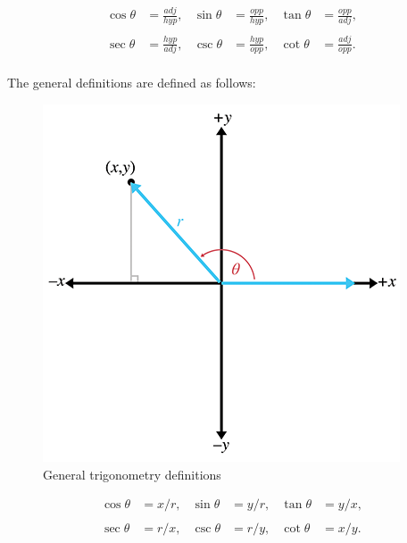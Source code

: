 \documentclass[11pt]{article}
\begin{document}
\[\begin{matrix}
{\cos\theta} & {= \frac{\mathit{a}\mathit{d}\mathit{j}}{\mathit{h}\mathit{y}\mathit{p}},} & {\sin\theta} & {= \frac{\mathit{o}\mathit{p}\mathit{p}}{\mathit{h}\mathit{y}\mathit{p}},} & {\tan\theta} & {= \frac{\mathit{o}\mathit{p}\mathit{p}}{\mathit{a}\mathit{d}\mathit{j}},} \\
 & & & & & \\
{\sec\theta} & {= \frac{\mathit{h}\mathit{y}\mathit{p}}{\mathit{a}\mathit{d}\mathit{j}},} & {\csc\theta} & {= \frac{\mathit{h}\mathit{y}\mathit{p}}{\mathit{o}\mathit{p}\mathit{p}},} & {\cot\theta} & {= \frac{\mathit{a}\mathit{d}\mathit{j}}{\mathit{o}\mathit{p}\mathit{p}}.} \\
\end{matrix}\]

The general definitions are defined as follows:
\begin{figure}[H]
\centering
    \includegraphics{01_general_trigonometry_definitions}
\caption{General trigonometry definitions}
\label{fig:general-trigonometry-definitions}
\end{figure}

\[\begin{matrix}
{\cos\theta} & {= x/r,} & {\sin\theta} & {= y/r,} & {\tan\theta} & {= y/x,} \\
 & & & & & \\
{\sec\theta} & {= r/x,} & {\csc\theta} & {= r/y,} & {\cot\theta} & {= x/y.} \\
\end{matrix}\]
\end{document}

